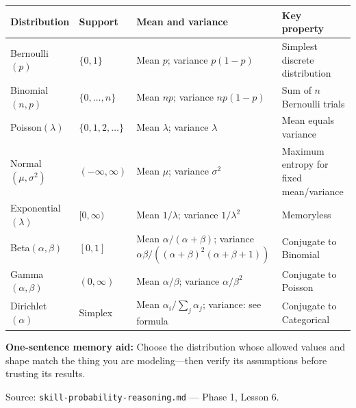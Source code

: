 \documentclass[11pt]{article}
\begin{document}
\small
\renewcommand{\arraystretch}{1.18}
\begin{tabularx}{\textwidth}{>{\raggedright\arraybackslash}p{} >{\raggedright\arraybackslash}p{} >{\raggedright\arraybackslash}p{} X}
\toprule
\textbf{Distribution} & \textbf{Support} & \textbf{Mean and variance} & \textbf{Key property} \\
\midrule
Bernoulli$(p)$ & $\{0,1\}$ & Mean $p$; variance $p(1-p)$ & Simplest discrete distribution \\
Binomial$(n,p)$ & $\{0,\ldots,n\}$ & Mean $np$; variance $np(1-p)$ & Sum of $n$ Bernoulli trials \\
Poisson$(\lambda)$ & $\{0,1,2,\ldots\}$ & Mean $\lambda$; variance $\lambda$ & Mean equals variance \\
Normal$(\mu,\sigma^2)$ & $(-\infty,\infty)$ & Mean $\mu$; variance $\sigma^2$ & Maximum entropy for fixed mean/variance \\
Exponential$(\lambda)$ & $[0,\infty)$ & Mean $1/\lambda$; variance $1/\lambda^2$ & Memoryless \\
Beta$(\alpha,\beta)$ & $[0,1]$ & Mean $\alpha/(\alpha+\beta)$; variance $\alpha\beta/((\alpha+\beta)^2(\alpha+\beta+1))$ & Conjugate to Binomial \\
Gamma$(\alpha,\beta)$ & $(0,\infty)$ & Mean $\alpha/\beta$; variance $\alpha/\beta^2$ & Conjugate to Poisson \\
Dirichlet$(\alpha)$ & Simplex & Mean $\alpha_i/\sum_j\alpha_j$; variance: see formula & Conjugate to Categorical \\
\bottomrule
\end{tabularx}
\normalsize

\begin{tcolorbox}[colback=softteal,colframe=teal,boxrule=0.7pt,arc=5pt,left=9pt,right=9pt,top=6pt,bottom=6pt]
\textbf{One-sentence memory aid:} Choose the distribution whose allowed values and shape match the thing you are modeling—then verify its assumptions before trusting its results.
\end{tcolorbox}

\vfill
\small\textcolor{muted}{Source: \texttt{skill-probability-reasoning.md} — Phase 1, Lesson 6.}
\end{document}
